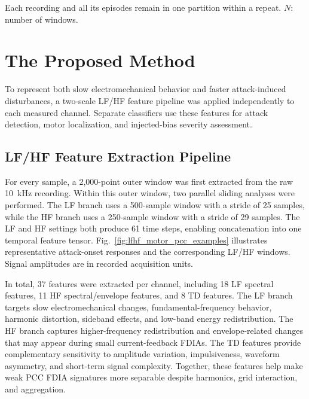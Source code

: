 \documentclass[letterpaper,journal]{IEEEtran}
\begin{document}
\begin{table}[t]
\par\smallskip
\begin{minipage}{\columnwidth}
\scriptsize
Each recording and all its episodes remain in one
partition within a repeat. $N$: number of windows.
\end{minipage}
\end{table}


\section{The Proposed Method}
\label{sec:method}

To represent both slow electromechanical behavior and faster attack-induced disturbances, a two-scale LF/HF feature pipeline was applied independently to each measured channel. Separate classifiers use these features for attack detection, motor localization, and injected-bias severity assessment.

\subsection{LF/HF Feature Extraction Pipeline}
\label{sec:lfhf_features}

For every sample, a 2{,}000-point outer window was first extracted from the raw 10~kHz recording. Within this outer window, two parallel sliding analyses were performed. The LF branch uses a 500-sample window with a stride of 25 samples, while the HF branch uses a 250-sample window with a stride of 29 samples. The LF and HF settings both produce 61 time steps, enabling concatenation into one temporal feature tensor.
Fig.~\ref{fig:lfhf_motor_pcc_examples} illustrates representative attack-onset responses and the corresponding LF/HF windows. Signal amplitudes are in recorded acquisition units.


In total, 37 features were extracted per channel, including 18 LF spectral features, 11 HF spectral/envelope features, and 8 TD features. The LF branch targets slow electromechanical changes, fundamental-frequency behavior, harmonic distortion, sideband effects, and low-band energy redistribution. The HF branch captures higher-frequency redistribution and envelope-related changes that may appear during small current-feedback FDIAs. The TD features provide complementary sensitivity to amplitude variation, impulsiveness, waveform asymmetry, and short-term signal complexity.
Together, these features help make weak PCC FDIA signatures more separable despite harmonics, grid interaction, and aggregation.
\end{document}
